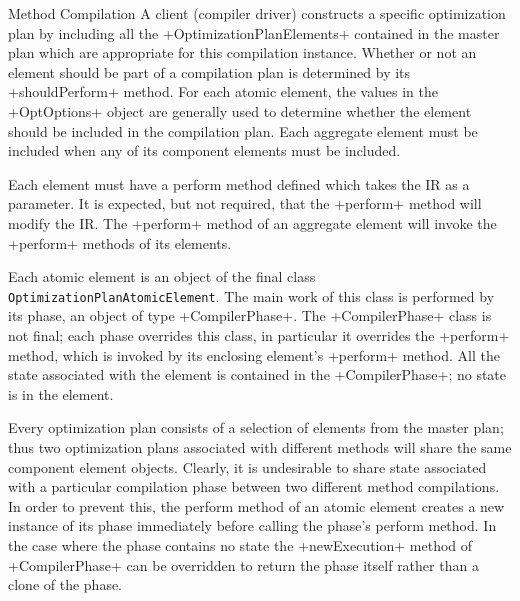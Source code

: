 \begin{subsection}{Method Compilation}
A client (compiler driver) constructs a specific optimization plan by including all the \spverb+OptimizationPlanElements+ contained in the master plan which are appropriate for this compilation instance. Whether or not an element should be part of a compilation plan is determined by its \spverb+shouldPerform+ method. For each atomic element, the values in the \spverb+OptOptions+ object are generally used to determine whether the element should be included in the compilation plan. Each aggregate element must be included when any of its component elements must be included.

Each element must have a perform method defined which takes the IR as a parameter. It is expected, but not required, that the \spverb+perform+ method will modify the IR. The \spverb+perform+ method of an aggregate element will invoke the \spverb+perform+ methods of its elements.

Each atomic element is an object of the final class \texttt{OptimizationPlanAtomicElement}. The main work of this class is performed by its phase, an object of type \spverb+CompilerPhase+. The \spverb+CompilerPhase+ class is not final; each phase overrides this class, in particular it overrides the \spverb+perform+ method, which is invoked by its enclosing element's \spverb+perform+ method. All the state associated with the element is contained in the \spverb+CompilerPhase+; no state is in the element.

Every optimization plan consists of a selection of elements from the master plan; thus two optimization plans associated with different methods will share the same component element objects. Clearly, it is undesirable to share state associated with a particular compilation phase between two different method compilations. In order to prevent this, the perform method of an atomic element creates a new instance of its phase immediately before calling the phase's perform method. In the case where the phase contains no state the \spverb+newExecution+ method of \spverb+CompilerPhase+ can be overridden to return the phase itself rather than a clone of the phase.

\end{subsection}

